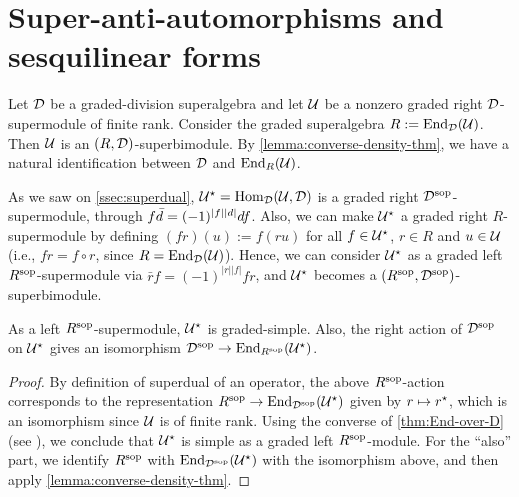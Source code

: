 \section[Super-anti-automorphisms and sesquilinear forms]{Super-anti-automorphisms and \texorpdfstring{\\}{} sesquilinear forms}\label{sec:super-anti-auto-and-sesquilinear}

Let $\mathcal{D}$ be a graded-division superalgebra and let $\mathcal U$ be a nonzero graded right $\mathcal{D}$-supermodule of finite rank. 
Consider the graded superalgebra $R := \operatorname{End}_{\mathcal{D}}(\mathcal U)$.
Then $\mathcal U$ is an $(R, \mathcal{D})$-superbimodule.
By \cref{lemma:converse-density-thm}, 
we have a natural identification between $\mathcal{D}$ and $\operatorname{End}_R(\mathcal U)$.


As we saw on \cref{ssec:superdual}, $\mathcal U^\star = \operatorname{Hom}_{\mathcal{D}} (\mathcal U, \mathcal{D})$ is a graded right $\mathcal{D}^{\mathrm{sop}}$-supermodule, through $f \bar d = (-1)^{|f||d|} df$.
Also, we can make $\mathcal U^\star$ a graded right $R$-supermodule by defining $(f r) (u) := f(r u)$ for all $f\in \mathcal U^\star$, $r\in R$ and $u\in \mathcal U$ (i.e., $f r = f \circ r$, since $R = \operatorname{End}_{\mathcal{D}}(\mathcal U)$).
Hence, we can consider $\mathcal U^\star$ as a graded left $R^{\mathrm{sop}}$-supermodule via $\bar r f = (-1)^{|r||f|} f r$, %
and $\mathcal U^\star$ becomes a $(R^{\mathrm{sop}}, \mathcal{D}^{\mathrm{sop}})$-superbimodule.

\begin{lemma}\label{lemma:U-star-R-sop}
    As a left $R^{\mathrm{sop}}$-supermodule, $\mathcal U^\star$ is graded-simple. Also, the right action of $\mathcal{D}^{\mathrm{sop}}$ on $\mathcal U^\star$ gives an isomorphism $\mathcal{D}^{\mathrm{sop}} \to \operatorname{End}_{R^{\mathrm{sop}}}(\mathcal U^\star)$.
\end{lemma}

\begin{proof}
	By definition of superdual of an operator, the above $R^{\mathrm{sop}}$-action corresponds to the representation $R^{\mathrm{sop}} \to \operatorname{End}_{\mathcal{D}^{\mathrm{sop}}} (\mathcal U^\star)$ given by $r \mapsto r^\star$, which is an isomorphism since $\mathcal U$ is of finite rank. 
	Using the converse of
	\cref{thm:End-over-D} (see \cite[page 31]{livromicha}), we conclude that $\mathcal U^\star$ is simple as a graded left $R^{\mathrm{sop}}$-module. 
	For the ``also'' part, we identify $R^{\mathrm{sop}}$ with $\operatorname{End}_{\mathcal{D}^{\mathrm{sop}}} (\mathcal U^\star)$ with the isomorphism above, and then apply
	\cref{lemma:converse-density-thm}.
\end{proof}

